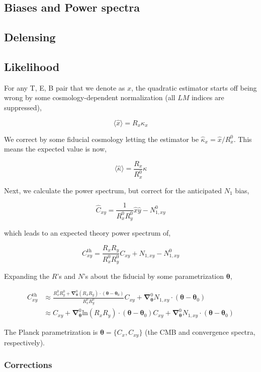 \documentclass[a4paper, 11pt]{article}
\begin{document}
\subsection{Biases and Power spectra}
\subsection{Delensing}
\subsection{Likelihood}

For any T, E, B pair that we denote as $x$, the quadratic estimator starts off being wrong by some cosmology-dependent normalization (all $LM$ indices are suppressed),

$$
\langle \hat{x} \rangle = R_{x} \kappa_x 
$$

We correct by some fiducial cosmology letting the estimator be $\hat{\kappa}_x = \hat{x} / R^0_x$. This means the expected value is now,

$$
\langle\hat\kappa\rangle = \frac{R_x}{R^0_x}\kappa 
$$

Next, we calculate the power spectrum, but correct for the anticipated $N_1$ bias,

$$
\hat{C}_{xy}=\frac{1}{R^0_xR^0_y}\hat{x}\hat{y} - N_{1,xy}^0
$$

which leads to an expected theory power spectrum of,

$$
C_{xy}^{\mathrm{th}}=\frac{R_xR_y}{R^0_xR^0_y}C_{xy} + N_{1,xy} - N_{1,xy}^0
$$

Expanding the $R$'s and $N$'s about the fiducial by some parametrization $\boldsymbol{\theta}$,

\newcommand{\bth}{\boldsymbol{\theta}}
\newcommand{\bna}{\boldsymbol{\nabla}}

\begin{align*}
C_{xy}^{\mathrm{th}}&\approx\frac{R^0_xR^0_y+\bna^0_{\bth} (R_xR_y)\cdot (\bth-\bth_0)}{R^0_xR^0_y}C_{xy} + \bna^0_{\bth} N_{1,xy}\cdot (\bth-\bth_0) \\
&\approx C_{xy}+\bna^0_{\bth} \mathrm{ln}(R_xR_y)\cdot (\bth-\bth_0)C_{xy} + \bna^0_{\bth} N_{1,xy}\cdot (\bth-\bth_0)
\end{align*}

The Planck parametrization is $\bth=\{C_x, C_{xy}\}$ (the CMB and convergence spectra, respectively).

\subsubsection{Corrections}
\end{document}
